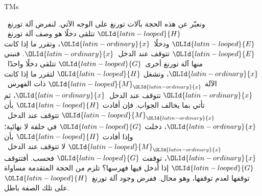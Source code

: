 \documentclass[../../../include/open-logic-section]{subfiles}
\begin{document}
\begin{tagblock}{TMs}
\begin{explain}
ونعبّر عن هذه الحجة بآلات تورنغ على الوجه الآتي. لنفرض آلة تورنغ~${\OLId{latin-looped}{H}}$ تتلقى
دخلًا هو وصف آلة تورنغ~${\OLId{latin-looped}{E}}$ ودخلًا~${\OLId{latin-ordinary}{x}}$، وتقرر ما إذا كانت ${\OLId{latin-looped}{E}}$ تتوقف
عند الدخل~${\OLId{latin-ordinary}{x}}$. فنبني منها آلة تورنغ أخرى~${\OLId{latin-looped}{G}}$ تتلقى دخلًا
واحدًا~${\OLId{latin-ordinary}{x}}$، وتشغل ${\OLId{latin-looped}{H}}$ لتقرر ما إذا كانت الآلة ${\OLId{latin-looped}{M}}_{\OLId{latin-ordinary}{x}}$ ذات الفهرس~${\OLId{latin-ordinary}{x}}$
تتوقف عند الدخل~${\OLId{latin-ordinary}{x}}$، ثم تأتي بما يخالف الجواب. فإن أفادت ${\OLId{latin-looped}{H}}$ بأن
${\OLId{latin-looped}{M}}_{\OLId{latin-ordinary}{x}}$ تتوقف عند الدخل~${\OLId{latin-ordinary}{x}}$، دخلت ${\OLId{latin-looped}{G}}$ في حلقة لا نهائية؛ وإذا أفادت
${\OLId{latin-looped}{H}}$ بأن ${\OLId{latin-looped}{M}}_{\OLId{latin-ordinary}{x}}$ لا تتوقف عند الدخل~${\OLId{latin-ordinary}{x}}$، توقفت ${\OLId{latin-looped}{G}}$ فحسب. أفتتوقف ${\OLId{latin-looped}{G}}$
إذا أُدخل فيها فهرسها؟ تلزم من الحجة المتقدمة مساواة توقفها لعدم
توقفها، وهو محال. ففرض وجود آلة تورنغ~${\OLId{latin-looped}{H}}$ على تلك الصفة
باطل.
\end{explain}
\end{tagblock}
\end{document}
